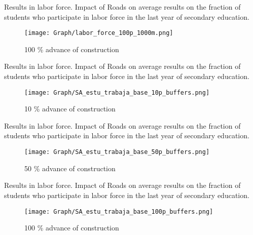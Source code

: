 \documentclass[9pt]{beamer}
\begin{document}
\begin{frame}{ Results in labor force.\hyperlink{result_labor}{} }\label{100p_labor}
Impact of Roads on average results on the fraction of students who participate in labor force in the last year of secondary education. 
\begin{figure}
  \centering
  \texttt{[image: Graph/labor\_force\_100p\_1000m.png]} 
  \caption{\small 100 \% advance of construction}
 
\end{figure}

\end{frame}
 
                            
\begin{frame}{ Results in labor force. \hyperlink{result_labor}{}  } \label{10p_labor_buf}
Impact of Roads on average results on the fraction of students who participate in labor force in the last year of secondary education. 
\begin{figure}
  \centering
  \texttt{[image: Graph/SA\_estu\_trabaja\_base\_10p\_buffers.png]} 
  \caption{\small 10 \% advance of construction}
  \label{fig:6.1sub-first}
\end{figure}

\end{frame}

\begin{frame}{ Results in labor force.\hyperlink{result_labor}{} }  \label{50p_labor_buf}
Impact of Roads on average results on the fraction of students who participate in labor force in the last year of secondary education. 
\begin{figure}
  \centering
  \texttt{[image: Graph/SA\_estu\_trabaja\_base\_50p\_buffers.png]} 
  \caption{\small 50 \% advance of construction}
  \label{fig:6.1sub-first}
\end{figure}

\end{frame}

\begin{frame}{ Results in labor force.\hyperlink{result_labor}{} }\label{100p_labor_buf}
Impact of Roads on average results on the fraction of students who participate in labor force in the last year of secondary education. 
\begin{figure}
  \centering
  \texttt{[image: Graph/SA\_estu\_trabaja\_base\_100p\_buffers.png]} 
  \caption{\small 100 \% advance of construction}
 
\end{figure}

\end{frame}
\end{document}
